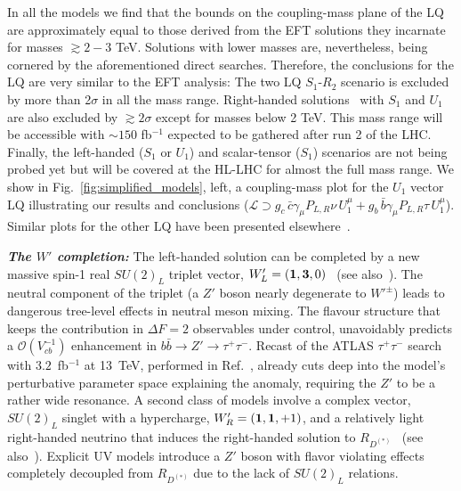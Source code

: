 \documentclass[%
 reprint,
 superscriptaddress,preprintnumbers,
 amsmath,amssymb,
 aps,
]{revtex4-1}
\begin{document}
In all the models we find that the bounds on the coupling-mass plane of the LQ are approximately equal to those derived from the EFT solutions they incarnate for masses $\gtrsim 2-3$ TeV. Solutions with lower masses are, nevertheless, being cornered by the aforementioned direct searches. Therefore, the conclusions for the LQ are very similar to the EFT analysis: The two LQ $S_1$-$R_2$ scenario is excluded by more than 2$\sigma$ in all the mass range. Right-handed solutions~\cite{Robinson:2018gza,Azatov:2018kzb} with $S_1$ and $U_1$ are also excluded by $\gtrsim2\sigma$ except for masses below 2 TeV. This mass range will be accessible with $\sim 150$ fb$^{-1}$ expected to be gathered after run 2 of the LHC. Finally, the left-handed ($S_1$ or $U_1$) and scalar-tensor ($S_1$) scenarios are not being probed yet but will be covered at the HL-LHC for almost the full mass range. We show in Fig.~\ref{fig:simplified_models}, left, a coupling-mass plot for the $U_1$ vector LQ illustrating our results and conclusions ($\mathcal{L} \supset g_{c}\, \bar c \gamma_\mu P_{L,R}\nu \, U_1^\mu + g_{b}\, \bar b \gamma_\mu P_{L,R}\tau \, U_1^\mu$). Similar plots for the other LQ have been presented elsewhere~\cite{AdmirTalk}.

\textit{\textbf{The $W'$ completion:}} The left-handed solution can be completed by a new massive spin-1 real $SU(2)_L$ triplet vector, $W'_L =({\bf 1},{\bf 3},0)$~\cite{Greljo:2015mma} (see also~\cite{Boucenna:2016qad,Barbieri:2016las,Megias:2017ove}). The neutral component of the triplet (a $Z'$ boson nearly degenerate to $W'^{\pm}$) leads to dangerous tree-level effects in neutral meson mixing. The flavour structure that keeps the contribution in $\Delta F =2$ observables under control, unavoidably predicts a $\mathcal{O}(V^{-1}_{c b})$ enhancement in $b \bar b \to Z' \to \tau^+ \tau^-$. Recast of the ATLAS $\tau^+ \tau^-$ search with $3.2$~fb$^{-1}$ at 13~TeV, performed in Ref.~\cite{Faroughy:2016osc}, already cuts deep into the model's perturbative parameter space explaining the anomaly, requiring the $Z'$ to be a rather wide resonance. A second class of models involve a complex vector, $SU(2)_L$ singlet with a hypercharge, $W^\prime_R=({\bf 1},{\bf 1},+1)$, and a relatively light right-handed neutrino that induces the right-handed solution to $R_{D^{(*)}}$~\cite{Greljo:2018ogz,Asadi:2018wea} (see also~\cite{Carena:2018cow,Babu:2018vrl}). Explicit UV models introduce a $Z'$ boson with flavor violating effects completely decoupled from $R_{D^{(*)}}$ due to the lack of $SU(2)_L$ relations.
\end{document}
